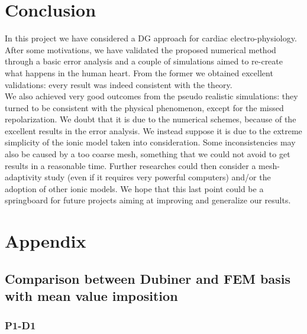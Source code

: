 \documentclass[a4paper,11pt]{article}
\begin{document}
\section{Conclusion}
In this project we have considered a DG approach for cardiac electro-physiology. After some motivations, we have validated the proposed numerical method through a basic error analysis and a couple of simulations aimed to re-create what happens in the human heart.
\noindent From the former we obtained excellent validations: every result was indeed consistent with the theory.\\
\noindent We also achieved very good outcomes from the pseudo realistic simulations: they turned to be consistent with the physical phenomenon, except for the missed repolarization. We doubt that it is due to the numerical schemes, because of the excellent results in the error analysis. We instead suppose it is due to the extreme simplicity of the ionic model taken into consideration. Some inconsistencies may also be caused by a too coarse mesh, something that we could not avoid to get results in a reasonable time. Further researches could then consider a mesh-adaptivity study (even if it requires very powerful computers) and/or the adoption of other ionic models.
\noindent We hope that this last point could be a springboard for future projects aiming at improving and generalize our results.  
\newpage



\section{Appendix}
\subsection{Comparison between Dubiner and FEM basis with mean value imposition} \label{D1_P1_mean}
\subsubsection{P1-D1}
\end{document}
